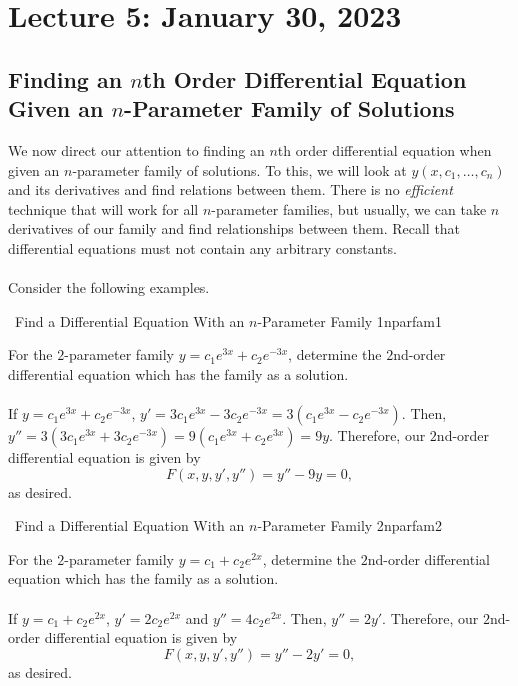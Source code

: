     \pagebreak

\section{Lecture 5: January 30, 2023}

    \subsection{Finding an \(n\)th Order Differential Equation Given an \(n\)-Parameter Family of Solutions}

        We now direct our attention to finding an \(n\)th order differential equation when given an \(n\)-parameter family of solutions. To this, we will look at \(y(x,c_1,\ldots,c_n)\) and its derivatives and find relations between them. There is no \textit{efficient} technique that will work for all \(n\)-parameter families, but usually, we can take \(n\) derivatives of our family and find relationships between them. Recall that differential equations must not contain any arbitrary constants.
        \\
        \\
        Consider the following examples.
        \begin{example}{\Difficulty\,\Difficulty\,\,Find a Differential Equation With an \(n\)-Parameter Family 1}{nparfam1}
        
            For the \(2\)-parameter family \(y=c_1e^{3x}+c_2e^{-3x}\), determine the \(2\)nd-order differential equation which has the family as a solution.
            \\
            \\
            If \(y=c_1e^{3x}+c_2e^{-3x}\), \(y'=3c_1e^{3x}-3c_2e^{-3x}=3(c_1e^{3x}-c_2e^{-3x})\). Then, \(y''=3(3c_1e^{3x}+3c_2e^{-3x})=9(c_1e^{3x}+c_2e^{3x})=9y\). Therefore, our \(2\)nd-order differential equation is given by
            \begin{equation*}
                F(x,y,y',y'')= y''-9y=0,
            \end{equation*}
            as desired.
        
        \end{example}
        \begin{example}{\Difficulty\,\Difficulty\,\,Find a Differential Equation With an \(n\)-Parameter Family 2}{nparfam2}
        
           For the \(2\)-parameter family \(y=c_1+c_2e^{2x}\), determine the \(2\)nd-order differential equation which has the family as a solution.
           \\
           \\
           If \(y=c_1+c_2e^{2x}\), \(y'=2c_2e^{2x}\) and \(y''=4c_2e^{2x}\). Then, \(y''=2y'\). Therefore, our \(2\)nd-order differential equation is given by
           \begin{equation*}
            F(x,y,y',y'')=y''-2y'=0,
           \end{equation*}
           as desired.
        
        \end{example}

